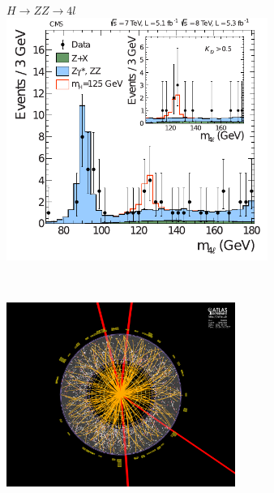 \documentclass[xcolor={usenames,dvipsnames,svgnames,table}]{beamer}
\begin{document}
\begin{frame}
\begin{columns}
\begin{column}{0.49\textwidth}
    \end{column}
	\begin{column}{0.49\textwidth}
        \begin{figure}[t]
			\\
			\vspace{-0.5cm}
			\centering \textcolor{color1}{$H \rightarrow ZZ \rightarrow 4l$}\\
            \includegraphics[width=0.8\textwidth]{plots/higgsZZ_discovery.pdf}
        \end{figure}\\
		\vspace{-0.9cm}
		\begin{figure}[t]
			\includegraphics[width=0.7\textwidth]{plots/atlas_event_display.png}
        \end{figure}
    \end{column}
	\end{columns}
\end{frame}
\end{document}

